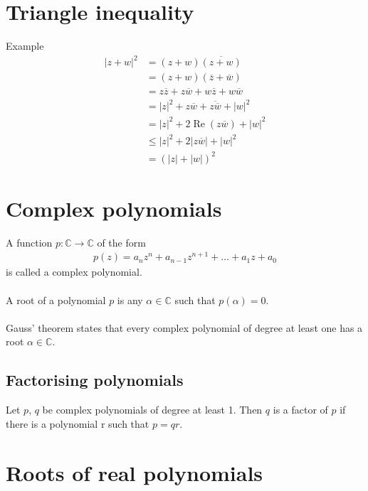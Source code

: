 \documentclass{report}
\renewcommand{\Re}{\operatorname{Re}}
\begin{document}
	\section{Triangle inequality}

		\begin{question}{Example}
			\begin{align*}
				|z+w|^2 &= (z+w)\overline{(z+w)}	\\
						&= (z+w)(\overline{z} + \overline{w})	\\
						&= z\overline{z} + z\overline{w} + w\overline{z} + w\overline{w}	\\
						&= |z|^2 + z\overline{w} + \overline{z\overline{w}} + |w|^2	\\
						&= |z|^2 + 2\Re(z\overline{w}) + |w|^2	\\
						&\leq |z|^2 + 2|z\overline{w}| + |w|^2	\\
						&= \left(|z| + |w|\right)^2
			\end{align*}
		\end{question}
		
	\section{Complex polynomials}
		
		A function $p: \mathbb{C} \to \mathbb{C}$ of the form
		\begin{align*}
			p(z) = a_nz^n + a_{n-1}z^{n+1} + \dots + a_1z + a_0
		\end{align*}
		is called a complex polynomial.
		\\ \\
		A root of a polynomial $p$ is any $\alpha \in \mathbb{C}$ such that $p(\alpha) = 0$.
		\\ \\
		Gauss' theorem states that every complex polynomial of degree at least one has a root $\alpha \in \mathbb{C}$.

		\subsection{Factorising polynomials}
			
			Let $p$, $q$ be complex polynomials of degree at least 1. Then $q$ is a factor of $p$ if there is a polynomial r such that $p=qr$.

	\section{Roots of real polynomials}
		
\end{document}
